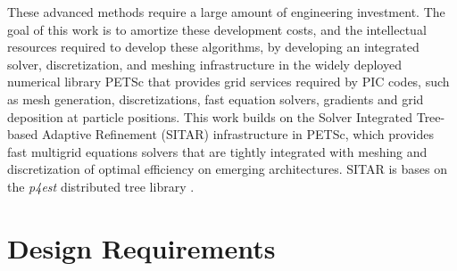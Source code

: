 \documentclass[review]{siamart}
\begin{document}
These advanced methods require a large amount of engineering investment.
The goal of this work is to amortize these development costs, and the intellectual resources required to develop these algorithms, by developing an integrated solver, discretization, and meshing infrastructure in the widely deployed numerical library PETSc that provides grid services required by PIC codes, such as mesh generation, discretizations, fast equation solvers, gradients and grid deposition at particle positions.
This work builds on the Solver Integrated Tree-based Adaptive Refinement (SITAR) infrastructure in PETSc, which provides fast multigrid equations solvers that are tightly integrated with meshing and discretization of optimal efficiency on emerging architectures.
SITAR is bases on the {\it p4est} distributed tree library \cite{DBLP:journals/siamsc/IsaacBWG15,Rudi:2015:EIS:2807591.2807675,Stadler1033}.

\section{Design Requirements}
\end{document}
